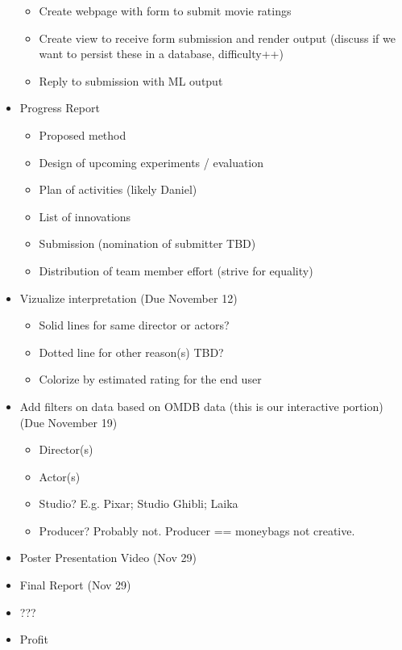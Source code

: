 \documentclass[sigchi, 12pt, nonacm=true, timestamp=true, screen=true]{acmart}
\begin{document}
\begin{itemize}
\begin{itemize}
      \item Create webpage with form to submit movie ratings
      \item Create view to receive form submission and render output (discuss if we want to persist these in a database, difficulty++)
      \item Reply to submission with ML output
    \end {itemize}
  \item Progress Report
    \begin{itemize}
      \item Proposed method
      \item Design of upcoming experiments / evaluation
      \item Plan of activities (likely Daniel)
      \item List of innovations
      \item Submission (nomination of submitter TBD)
      \item Distribution of team member effort (strive for equality)
    \end{itemize}
  \item Vizualize interpretation (Due November 12)
    \begin{itemize}
      \item Solid lines for same director or actors?
      \item Dotted line for other reason(s) TBD?
      \item Colorize by estimated rating for the end user
    \end{itemize}
  \item Add filters on data based on OMDB data (this is our interactive portion) (Due November 19)
    \begin{itemize}
      \item Director(s)
      \item Actor(s)
      \item Studio? E.g. Pixar; Studio Ghibli; Laika
      \item Producer? Probably not. Producer == moneybags not creative.
    \end{itemize}
  \item Poster Presentation Video (Nov 29)
  \item Final Report (Nov 29)
  \item ???
  \item Profit
\end{itemize}






\end{document}
